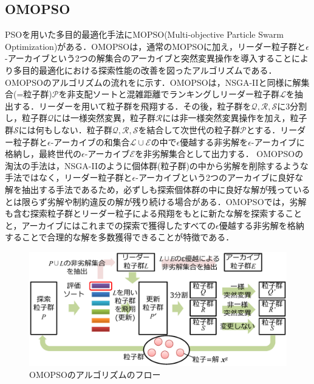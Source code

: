 \subsection{OMOPSO\cite{Sierra05}}\label{subsec::OMOPSO}
PSOを用いた多目的最適化手法にMOPSO(Multi-objective Particle Swarm Optimization)がある．OMOPSOは，通常のMOPSOに加え，リーダー粒子群と$\epsilon$-アーカイブという2つの解集合のアーカイブと突然変異操作を導入することにより多目的最適化における探索性能の改善を図ったアルゴリズムである．OMOPSOのアルゴリズムの流れをに示す．OMOPSOは，NSGA-IIと同様に解集合(=粒子群)$\mathcal{P}$を非支配ソートと混雑距離でランキングしリーダー粒子群$\mathcal{L}$を抽出する．リーダーを用いて粒子群を飛翔する．その後，粒子群を$\mathcal{Q}, \mathcal{R}, \mathcal{S}$に3分割し，粒子群$\mathcal{Q}$には一様突然変異，粒子群$\mathcal{R}$には非一様突然変異操作を加え，粒子群$\mathcal{S}$には何もしない．粒子群$\mathcal{Q}, \mathcal{R}, \mathcal{S}$を結合して次世代の粒子群$\mathcal{P}$とする．リーダー粒子群と$\epsilon$-アーカイブの和集合$\mathcal{L} \cup \mathcal{E}$の中で$\epsilon$優越する非劣解を$\epsilon$-アーカイブに格納し，最終世代の$\epsilon$-アーカイブ$\mathcal{E}$を非劣解集合として出力する．
OMOPSOの淘汰の手法は，NSGA-IIのように個体群(粒子群)の中から劣解を削除するような手法ではなく，リーダー粒子群と$\epsilon$-アーカイブという2つのアーカイブに良好な解を抽出する手法であるため，必ずしも探索個体群の中に良好な解が残っているとは限らず劣解や制約違反の解が残り続ける場合がある．OMOPSOでは，劣解も含む探索粒子群とリーダー粒子による飛翔をもとに新たな解を探索することと，アーカイブにはこれまでの探索で獲得したすべての$\epsilon$優越する非劣解を格納することで合理的な解を多数獲得できることが特徴である．
\begin{figure}[ht]
    \begin{center}
        \includegraphics[width=1.0\textwidth,keepaspectratio=true]{fig/theory_omopso.eps}
    \end{center}
    \caption{OMOPSOのアルゴリズムのフロー}
    \label{fig::theory_omopso}
\end{figure}

